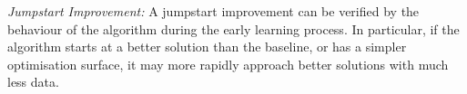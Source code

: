 \noindent\textit{Jumpstart Improvement:}
A jumpstart improvement can be verified by the behaviour of the algorithm during the early learning process. In particular, if the algorithm starts at a better solution than the baseline, or has a simpler optimisation surface, it may more rapidly approach better solutions with much less data.%
\setlength{\textfloatsep}{4pt}%

